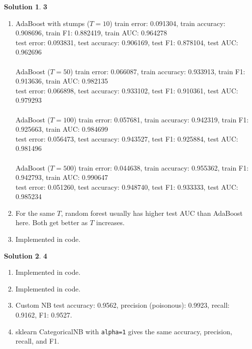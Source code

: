 \documentclass[11pt]{article}
\theoremstyle{definition}
\theoremstyle{nopunct}
\newtheorem*{s}{Solution}
\begin{document}
\begin{s}\textbf{3}
    \begin{enumerate}
        \item AdaBoost with stumps ($T = 10$) train error: 0.091304, train accuracy: 0.908696, train F1: 0.882419, train AUC: 0.964278 \\
            test error: 0.093831, test accuracy: 0.906169, test F1: 0.878104, test AUC: 0.962696 \\
            \bigskip \\
            AdaBoost ($T = 50$) train error: 0.066087, train accuracy: 0.933913, train F1: 0.913636, train AUC: 0.982135 \\
            test error: 0.066898, test accuracy: 0.933102, test F1: 0.910361, test AUC: 0.979293 \\
            \bigskip \\
            AdaBoost ($T = 100$) train error: 0.057681, train accuracy: 0.942319, train F1: 0.925663, train AUC: 0.984699 \\
            test error: 0.056473, test accuracy: 0.943527, test F1: 0.925884, test AUC: 0.981496 \\
            \bigskip \\
            AdaBoost ($T = 500$) train error: 0.044638, train accuracy: 0.955362, train F1: 0.942793, train AUC: 0.990647 \\
            test error: 0.051260, test accuracy: 0.948740, test F1: 0.933333, test AUC: 0.985234

        \item For the same $T$, random forest usually has higher test AUC than AdaBoost here. Both get better as $T$ increases.

        \item Implemented in code.
    \end{enumerate}
\end{s}

\vspace{10pt}

\begin{s}\textbf{4}
    \begin{enumerate}
        \item Implemented in code.

        \item Implemented in code.

        \item Custom NB test accuracy: 0.9562, precision (poisonous): 0.9923, recall: 0.9162, F1: 0.9527.

        \item sklearn CategoricalNB with \texttt{alpha=1} gives the same accuracy, precision, recall, and F1.
    \end{enumerate}
\end{s}
\end{document}
